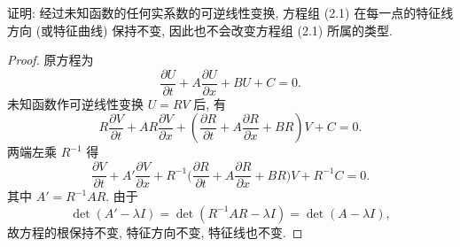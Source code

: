 \begin{exercise}
  证明: 经过未知函数的任何实系数的可逆线性变换, 方程组 (2.1) 在每一点的特征线方向
  (或特征曲线) 保持不变, 因此也不会改变方程组 (2.1) 所属的类型.
\end{exercise}

\begin{proof}
  原方程为
  \[\frac{\partial U}{\partial t}+A\frac{\partial U}{\partial x}+BU+C = 0.\]
  未知函数作可逆线性变换 $U=RV$ 后, 有
  \[R\frac{\partial V}{\partial t}+AR\frac{\partial V}{\partial x}
    + \left(\frac{\partial R}{\partial t}+A\frac{\partial R}{\partial x}
    + BR\right)V + C = 0.\]
  两端左乘 $R^{-1}$ 得
  \[\frac{\partial V}{\partial t} + A' \frac{\partial V}{\partial x}
    + R^{-1}\biggl(\frac{\partial R}{\partial t} + A \frac{\partial R}{\partial x}
                    + BR\biggr)V + R^{-1}C = 0.\]
  其中 $A' = R^{-1}AR$. 由于
  \[\det(A'-\lambda I) = \det(R^{-1}AR - \lambda I)
    = \det(A - \lambda I),\]
  故方程的根保持不变, 特征方向不变, 特征线也不变.
\end{proof}